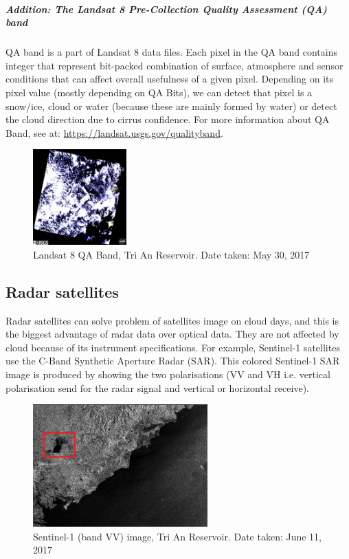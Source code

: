 \subparagraph{Addition: The Landsat 8 Pre-Collection Quality Assessment (QA) band}

QA band is a part of Landsat 8 data files. Each pixel in the QA band contains integer that represent bit-packed combination of surface, atmosphere and sensor conditions that can affect overall usefulness of a given pixel. Depending on its pixel value (mostly depending on QA Bits), we can detect that pixel is a snow/ice, cloud or water (because these are mainly formed by water) or detect the cloud direction due to cirrus confidence. For more information about QA Band, see at: \href{https://landsat.usgs.gov/qualityband}{https://landsat.usgs.gov/qualityband}.

\begin{figure}
	\centering
	\includegraphics[width=0.32\textwidth]{figures/qaL8.jpg}
	\caption[]{Landsat 8 QA Band, Tri An Reservoir. Date taken: May 30, 2017}
\end{figure}

\subsection{Radar satellites}

Radar satellites can solve problem of satellites image on cloud days, and this is the biggest advantage of radar data over optical data. They are not affected by cloud because of its instrument specifications. For example, Sentinel-1 satellites use the C-Band Synthetic Aperture Radar (SAR). This colored Sentinel-1 SAR image is produced by showing the two polarisations (VV and VH i.e. vertical polarisation send for the radar signal and vertical or horizontal receive). 

\begin{figure}[h!]
	\centering
	\includegraphics[width=0.6\textwidth]{figures/sarImgVVS1.png}
	\caption[]{Sentinel-1 (band VV) image, Tri An Reservoir. Date taken: June 11, 2017}
\end{figure}	

